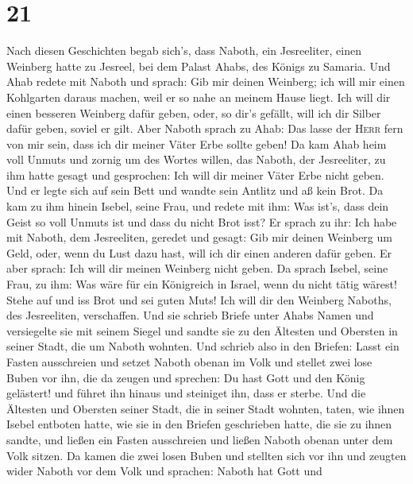 \hypertarget{section-20}{%
\section{21}\label{section-20}}

 Nach diesen Geschichten begab sich's, dass Naboth, ein
Jesreeliter, einen Weinberg hatte zu Jesreel, bei dem Palast Ahabs, des
Königs zu Samaria.  Und Ahab redete mit Naboth und sprach:
Gib mir deinen Weinberg; ich will mir einen Kohlgarten daraus machen,
weil er so nahe an meinem Hause liegt. Ich will dir einen besseren
Weinberg dafür geben, oder, so dir's gefällt, will ich dir Silber dafür
geben, soviel er gilt.  Aber Naboth sprach zu Ahab: Das
lasse der \textsc{Herr} fern von mir sein, dass ich dir meiner Väter
Erbe sollte geben!  Da kam Ahab heim voll Unmuts und
zornig um des Wortes willen, das Naboth, der Jesreeliter, zu ihm hatte
gesagt und gesprochen: Ich will dir meiner Väter Erbe nicht geben. Und
er legte sich auf sein Bett und wandte sein Antlitz und aß kein Brot.
 Da kam zu ihm hinein Isebel, seine Frau, und redete mit
ihm: Was ist's, dass dein Geist so voll Unmuts ist und dass du nicht
Brot isst?  Er sprach zu ihr: Ich habe mit Naboth, dem
Jesreeliten, geredet und gesagt: Gib mir deinen Weinberg um Geld, oder,
wenn du Lust dazu hast, will ich dir einen anderen dafür geben. Er aber
sprach: Ich will dir meinen Weinberg nicht geben.  Da
sprach Isebel, seine Frau, zu ihm: Was wäre für ein Königreich in
Israel, wenn du nicht tätig wärest! Stehe auf und iss Brot und sei guten
Muts! Ich will dir den Weinberg Naboths, des Jesreeliten, verschaffen.
 Und sie schrieb Briefe unter Ahabs Namen und versiegelte
sie mit seinem Siegel und sandte sie zu den Ältesten und Obersten in
seiner Stadt, die um Naboth wohnten.  Und schrieb also in
den Briefen: Lasst ein Fasten ausschreien und setzet Naboth obenan im
Volk  und stellet zwei lose Buben vor ihn, die da zeugen
und sprechen: Du hast Gott und den König gelästert! und führet ihn
hinaus und steiniget ihn, dass er sterbe.  Und die
Ältesten und Obersten seiner Stadt, die in seiner Stadt wohnten, taten,
wie ihnen Isebel entboten hatte, wie sie in den Briefen geschrieben
hatte, die sie zu ihnen sandte,  und ließen ein Fasten
ausschreien und ließen Naboth obenan unter dem Volk sitzen.
 Da kamen die zwei losen Buben und stellten sich vor ihn
und zeugten wider Naboth vor dem Volk und sprachen: Naboth hat Gott und
